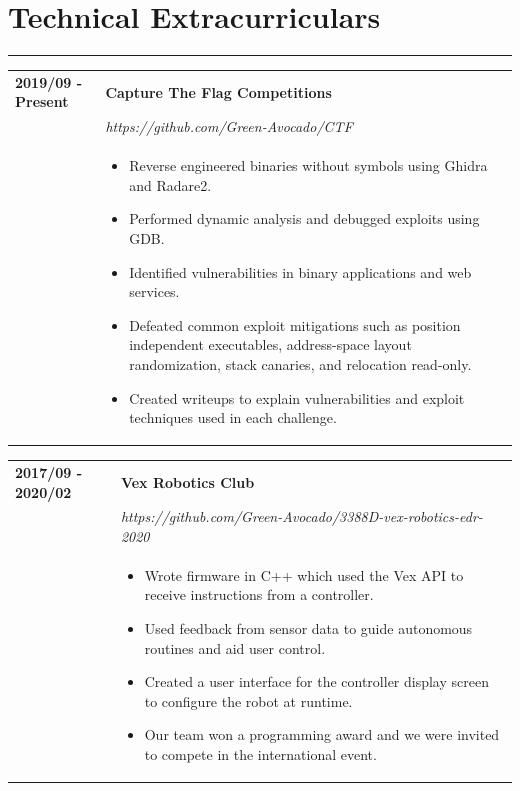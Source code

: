 \documentclass[letterpaper]{article}
\newcommand{\sect}[1]{\section*{#1}
                        {\color{cyan}
                        \rule{\textwidth}{1pt}
                        \vspace{-1ex}}}
\begin{document}
    \sect{Technical Extracurriculars}

        \begin{tabular}{p{} p{}}
            \textbf{2019/09 - Present} & \textbf{Capture The Flag Competitions} \\
            & \emph{https://github.com/Green-Avocado/CTF} \\
            & \begin{itemize}
                \item Reverse engineered binaries without symbols using Ghidra and Radare2.
                \item Performed dynamic analysis and debugged exploits using GDB.
                \item Identified vulnerabilities in binary applications and web services.
                \item Defeated common exploit mitigations such as position independent executables,
                    address-space layout randomization, stack canaries, and relocation read-only.
                \item Created writeups to explain vulnerabilities and exploit techniques used in each
                    challenge.
            \end{itemize}
        \end{tabular}

        \begin{tabular}{p{} p{}}
            \textbf{2017/09 - 2020/02} & \textbf{Vex Robotics Club} \\
            & \emph{https://github.com/Green-Avocado/3388D-vex-robotics-edr-2020} \\
            & \begin{itemize}
                \item Wrote firmware in C++ which used the Vex API to receive instructions from a
                    controller.
                \item Used feedback from sensor data to guide autonomous routines and aid user control.
                \item Created a user interface for the controller display screen to configure the robot at
                    runtime.
                \item Our team won a programming award and we were invited to compete in the international
                    event.
            \end{itemize}
        \end{tabular}
\end{document}
